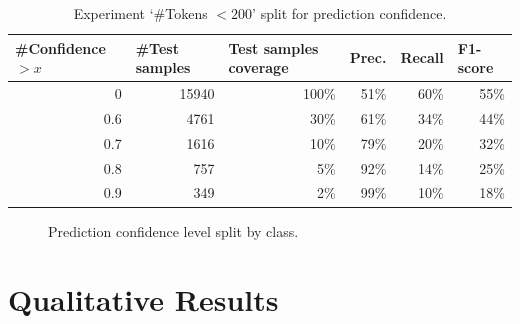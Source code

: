 \begin{table}[h!]
\centering
\caption{Experiment `\#Tokens $< 200$' split for prediction confidence.\label{tbl:rq2_token_200}}

\begin{tabular}{|r|r|r|r|r|r|}
\hline
  \multicolumn{1}{|l|}{\#Confidence $> x$} &
  \multicolumn{1}{l|}{\#Test samples} &
  \multicolumn{1}{l|}{Test samples coverage} &
  \multicolumn{1}{l|}{Prec.} &
  \multicolumn{1}{l|}{Recall} &
  \multicolumn{1}{l|}{F1-score} \\ 
\hline
0   & 15940 & 100\% & 51\% & 60\% & 55\% \\
0.6 & 4761  & 30\%  & 61\% & 34\% & 44\% \\
0.7 & 1616  & 10\%  & 79\% & 20\% & 32\% \\
0.8 & 757   & 5\%   & 92\% & 14\% & 25\% \\
0.9 & 349   & 2\%   & 99\% & 10\% & 18\% \\ 
\hline
\end{tabular}
\end{table}

\begin{figure}[h!]
 \centering
 \caption[Prediction confidence level split by class.]{Prediction confidence level split by class.}
    \label{fig:rq2_box_plot}
\end{figure}


\section{Qualitative Results}


